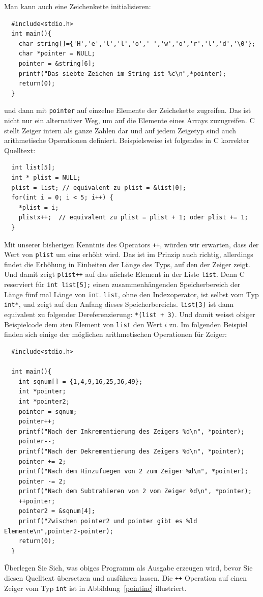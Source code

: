 Man kann auch eine Zeichenkette initialisieren:
\begin{lstlisting}
  #include<stdio.h>
  int main(){
    char string[]={'H','e','l','l','o',' ','w','o','r','l','d','\0'};
    char *pointer = NULL;
    pointer = &string[6];
    printf("Das siebte Zeichen im String ist %c\n",*pointer);
    return(0);
  }
\end{lstlisting} 
und dann mit \verb|pointer| auf einzelne Elemente der Zeichekette zugreifen.
Das ist nicht nur ein alternativer Weg, um auf die Elemente eines Arrays zuzugreifen.
C stellt Zeiger intern als ganze Zahlen dar und auf jedem Zeigetyp sind auch arithmetische Operationen definiert.
Beispielsweise ist folgendes in C korrekter Quelltext:
\begin{lstlisting}
  int list[5];
  int * plist = NULL;
  plist = list; // equivalent zu plist = &list[0];
  for(int i = 0; i < 5; i++) {
    *plist = i;
    plistx++;  // equivalent zu plist = plist + 1; oder plist += 1;
  }
\end{lstlisting}
Mit unserer bisherigen Kenntnis des Operators \verb|++|, würden wir erwarten, dass der Wert von \verb|plist| um eins erhöht wird.
Das ist im Prinzip auch richtig, allerdings findet die Erhöhung in Einheiten der Länge des Typs, auf den der Zeiger zeigt.
Und damit zeigt \verb|plist++| auf das nächste Element in der Liste \verb|list|.
Denn C reserviert für \verb|int list[5];| einen zusammenhängenden Speicherbereich der Länge fünf mal Länge von \verb|int|.
\verb|list|, ohne den Indexoperator, ist selbst vom Typ \verb|int*|, und zeigt auf den Anfang dieses Speicherbereichs. 
\verb|list[3]| ist dann equivalent zu folgender Dereferenzierung: \verb|*(list + 3)|.
Und damit weisst obiger Beispielcode dem $i$ten Element von \verb|list| den Wert $i$ zu.
Im folgenden Beispiel finden sich einige der möglichen arithmetischen Operationen für Zeiger:
\begin{lstlisting}
  #include<stdio.h>

  int main(){
    int sqnum[] = {1,4,9,16,25,36,49};
    int *pointer;
    int *pointer2;
    pointer = sqnum;
    pointer++;
    printf("Nach der Inkrementierung des Zeigers %d\n", *pointer);
    pointer--;
    printf("Nach der Dekrementierung des Zeigers %d\n", *pointer);
    pointer += 2;
    printf("Nach dem Hinzufuegen von 2 zum Zeiger %d\n", *pointer);
    pointer -= 2;
    printf("Nach dem Subtrahieren von 2 vom Zeiger %d\n", *pointer);   
    ++pointer;
    pointer2 = &sqnum[4];
    printf("Zwischen pointer2 und pointer gibt es %ld Elemente\n",pointer2-pointer);
    return(0);
  }
\end{lstlisting}
Überlegen Sie Sich, was obiges Programm als Ausgabe erzeugen wird, bevor Sie diesen Quelltext übersetzen und ausführen lassen.
Die \verb|++| Operation auf einen Zeiger vom Typ \verb|int| ist in Abbildung~\ref{pointinc} illustriert.

